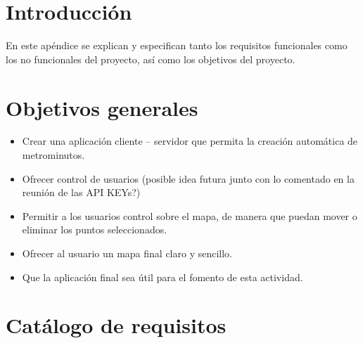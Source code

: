 
\section{Introducción}
En este apéndice se explican y especifican tanto los requisitos funcionales como los no funcionales del proyecto, así como los objetivos del proyecto.

\section{Objetivos generales}

\begin{itemize}
	\item Crear una aplicación cliente -- servidor que permita la creación automática de metrominutos.
    \item Ofrecer control de usuarios (posible idea futura junto con lo comentado en la reunión de las API KEYs?)
    \item Permitir a los usuarios control sobre el mapa, de manera que puedan mover o eliminar los puntos seleccionados.
    \item Ofrecer al usuario un mapa final claro y sencillo.
    \item Que la aplicación final sea útil para el fomento de esta actividad.
\end{itemize}

\section{Catálogo de requisitos}

